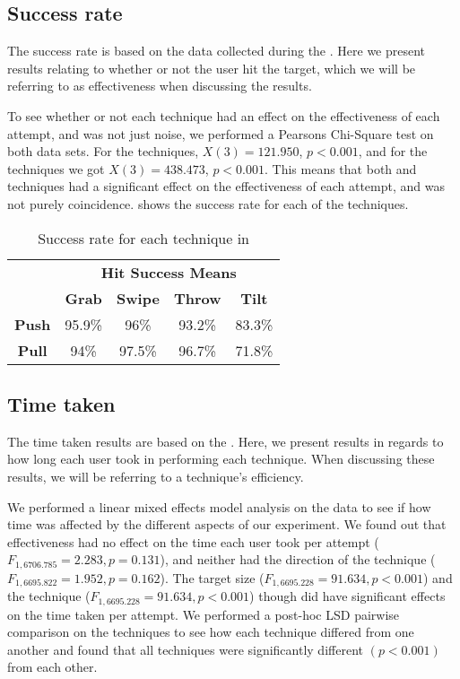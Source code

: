 \subsection{Success rate}
The success rate is based on the data collected during the \target. 
Here we present results relating to whether or not the user hit the target, which we will be referring to as effectiveness when discussing the results. 

To see whether or not each technique had an effect on the effectiveness of each attempt, and was not just noise, we performed a Pearsons Chi-Square test on both data sets. 
For the \push techniques, $X(3)=121.950$, $p<0.001$, and for the \pull techniques we got $X(3)=438.473$, $p<0.001$. 
This means that both \push and \pull techniques had a significant effect on the effectiveness of each attempt, and was not purely coincidence. 
 shows the success rate for each of the techniques. 

\begin{table}[H]
	\centering
	\def\arraystretch{1.5}
		\begin{tabular}{c c c c c}
			\cline{2-5}
			& \multicolumn{4}{c}{\textbf{Hit Success Means}} \\
			\cline{2-5}
			& \textbf{Grab} & \textbf{Swipe} & \textbf{Throw} & \textbf{Tilt} \\ \hline
			\textbf{Push} & 95.9\% & 96\% & 93.2\% & 83.3\% \\ \hline
			\textbf{Pull} & 94\% & 97.5\% & 96.7\% & 71.8\% \\ \hline
		\end{tabular}
	\caption{Success rate for each technique in \target}
	\label{tab:successRate}
\end{table}

\subsection{Time taken}
The time taken results are based on the \target.
Here, we present results in regards to how long each user took in performing each technique. 
When discussing these results, we will be referring to a technique's efficiency.

We performed a linear mixed effects model analysis on the data to see if how time was affected by the different aspects of our experiment. 
We found out that effectiveness had no effect on the time each user took per attempt ($F_{1,6706.785} = 2.283, p = 0.131$), and neither had the direction of the technique ($F_{1,6695.822} = 1.952, p = 0.162$). 
The target size ($F_{1,6695.228} = 91.634, p < 0.001$) and the technique  ($F_{1,6695.228} = 91.634, p < 0.001$) though did have significant effects on the time taken per attempt. 
We performed a post-hoc LSD pairwise comparison on the techniques to see how each technique differed from one another and found that all techniques were significantly different $(p<0.001)$ from each other. 

